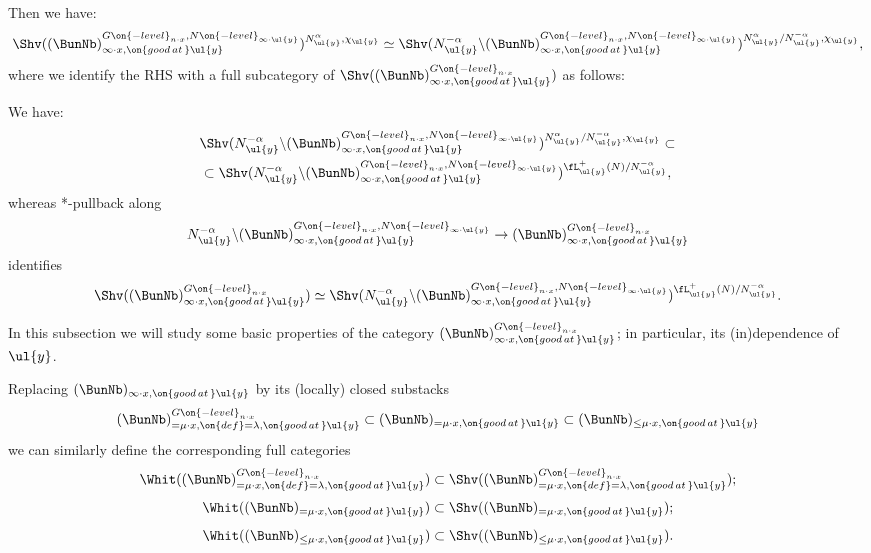 \documentclass[9pt]{amsart}
\theoremstyle{definition}
\theoremstyle{remark}
\numberwithin{equation}{section}
\begin{document}
Then we have: 
$$\Shv((\BunNb)^{G\on{-level}_{n\cdot x},N\on{-level}_{\infty\cdot \ul{y}}}_{\infty\cdot x,\on{good\,at\,}\ul{y}})^{N^\alpha_{\ul{y}},\chi_{\ul{y}}}\simeq
\Shv(N^{-\alpha}_{\ul{y}}\backslash (\BunNb)^{G\on{-level}_{n\cdot x},N\on{-level}_{\infty\cdot \ul{y}}}_{\infty\cdot x,\on{good\,at\,}\ul{y}})
^{N^\alpha_{\ul{y}}/N^{-\alpha}_{\ul{y}},\chi_{\ul{y}}},$$
where we identify the RHS with a full subcategory of $\Shv((\BunNb)_{\infty\cdot x,\on{good\,at\,}\ul{y}}^{G\on{-level}_{n\cdot x}})$
as follows:

\medskip

We have:
\begin{multline*} 
\Shv(N^{-\alpha}_{\ul{y}}\backslash (\BunNb)^{G\on{-level}_{n\cdot x},N\on{-level}_{\infty\cdot \ul{y}}}_{\infty\cdot x,\on{good\,at\,}\ul{y}})
^{N^\alpha_{\ul{y}}/N^{-\alpha}_{\ul{y}},\chi_{\ul{y}}}\subset \\
\subset \Shv(N^{-\alpha}_{\ul{y}}\backslash (\BunNb)^{G\on{-level}_{n\cdot x},N\on{-level}_{\infty\cdot \ul{y}}}_{\infty\cdot x,\on{good\,at\,}\ul{y}})
^{\fL^+_{\ul{y}}(N)/N^{-\alpha}_{\ul{y}}},
\end{multline*} 
whereas  *-pullback along 
$$N^{-\alpha}_{\ul{y}}\backslash (\BunNb)^{G\on{-level}_{n\cdot x},N\on{-level}_{\infty\cdot \ul{y}}}_{\infty\cdot x,\on{good\,at\,}\ul{y}}\to 
(\BunNb)_{\infty\cdot x,\on{good\,at\,}\ul{y}}^{G\on{-level}_{n\cdot x}}$$
identifies 
$$\Shv((\BunNb)_{\infty\cdot x,\on{good\,at\,}\ul{y}}^{G\on{-level}_{n\cdot x}})\simeq 
\Shv(N^{-\alpha}_{\ul{y}}\backslash (\BunNb)^{G\on{-level}_{n\cdot x},N\on{-level}_{\infty\cdot \ul{y}}}_{\infty\cdot x,\on{good\,at\,}\ul{y}})
^{\fL^+_{\ul{y}}(N)/N^{-\alpha}_{\ul{y}}}.$$




In this subsection we will study some basic properties of the category $(\BunNb)_{\infty\cdot x,\on{good\,at\,}\ul{y}}^{G\on{-level}_{n\cdot x}}$;
in particular, its (in)dependence of $\ul{y}$.

\sssec{}

Replacing $(\BunNb)_{\infty\cdot x,\on{good\,at\,}\ul{y}}$ by its (locally) closed substacks
$$(\BunNb)_{=\mu\cdot x,\on{def}=\lambda,\on{good\,at\,}\ul{y}}^{G\on{-level}_{n\cdot x}}\subset 
(\BunNb)_{=\mu\cdot x,\on{good\,at\,}\ul{y}}\subset (\BunNb)_{\leq \mu\cdot x,\on{good\,at\,}\ul{y}}$$
we can similarly define the corresponding full categories
$$\Whit((\BunNb)_{=\mu\cdot x,\on{def}=\lambda,\on{good\,at\,}\ul{y}}^{G\on{-level}_{n\cdot x}})\subset 
\Shv((\BunNb)_{=\mu\cdot x,\on{def}=\lambda,\on{good\,at\,}\ul{y}}^{G\on{-level}_{n\cdot x}});$$
$$\Whit((\BunNb)_{=\mu\cdot x,\on{good\,at\,}\ul{y}})\subset \Shv((\BunNb)_{=\mu\cdot x,\on{good\,at\,}\ul{y}});$$
$$\Whit((\BunNb)_{\leq \mu\cdot x,\on{good\,at\,}\ul{y}})\subset \Shv((\BunNb)_{\leq \mu\cdot x,\on{good\,at\,}\ul{y}}).$$
\end{document}
